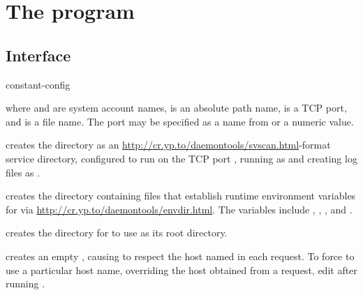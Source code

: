 
\chapter{The  program}

\section{Interface}
\begin{code}
  constant-config     
\end{code}
where  and  are system account names,
 is an absolute path name,  is a TCP port, and
 is a file name.  The port may be specified as a name from
 or a numeric value.

 creates the directory  as an
\href{svscan}{http://cr.yp.to/daemontools/svscan.html}-format service
directory, configured to run  on the TCP port
, running  as  and creating log
files as .

 creates the directory 
containing files that establish runtime environment variables for
 via \href{envdir}{http://cr.yp.to/daemontools/envdir.html}.
The variables include , , , and
.

 creates the directory  for
 to use as its root directory.

 creates an empty
, causing  to
respect the host named in each request.  To force
 to use a particular host name, overriding the
host obtained from a request, edit 
after running .

